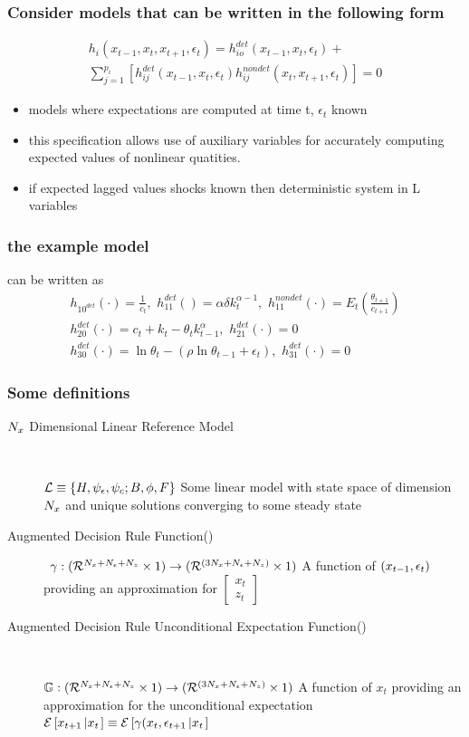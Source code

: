 \documentclass[tikz]{beamer}
\begin{document}
\begin{frame}
\frametitle{Consider  models that can be written in  the following form}


\begin{gather}
  h_i(x_{t-1},x_{t},x_{t+1},\epsilon_t)=h^{det}_{io}(x_{t-1},x_{t},\epsilon_t)+\\ \sum_{j=1}^{p_i} [h^{det}_{ij}(x_{t-1},x_{t},\epsilon_t)h^{nondet}_{ij}(x_{t},x_{t+1},\epsilon_t)]=0
\end{gather}

\begin{itemize}
\item models where expectations are computed at time t, $\epsilon_t$  known
\item this specification allows use of auxiliary variables for 
accurately computing expected values of nonlinear quatities.
\item if expected lagged values shocks known then deterministic system in L variables
\end{itemize}

\end{frame}


\begin{frame}
\frametitle{the example  model }
\label{sec:simple-rbc-model-ext} can be written as
\begin{gather}
h_{10^{det}}(\cdot)=\frac{1}{c_t},\,\,
h_{11}^{det}()=\alpha \delta k_{t}^{\alpha-1} ,\,\,
h_{11}^{nondet}(\cdot)=E_t \left (\frac{\theta_{t+1}}{c_{t+1}} \right )\\
h_{20}^{det}(\cdot)=c_t + k_t-\theta_tk_{t-1}^\alpha,\,\,
h_{21}^{det}(\cdot)=0\\
h_{30}^{det}(\cdot)=\ln \theta_t -(\rho \ln \theta_{t-1} + \epsilon_t),\,\,
h_{31}^{det}(\cdot)=0
\end{gather}

\end{frame}

\begin{frame}
  \frametitle{Some definitions}
  \begin{description}
  \item[${N_x}$ Dimensional Linear Reference Model] \ 

${\mathcal{L}} \equiv {\{H,\psi_\epsilon,\psi_c;B,\phi,F\}}$ Some linear model with state space of dimension
${N_x}$ and unique solutions converging 
to some steady state
  \item[Augmented Decision Rule Function(\ADR)]  \ 
${{\gamma}}: {({\mathcal{R}^{{N_x}+{N_\epsilon}+{N_z}}}\times 1)\rightarrow ({\mathcal{R}^{({3{N_x}+{N_\epsilon}+{N_z}})}}\times 1)}$  A function of ${(x_{t-1},\epsilon_t)}$ providing an approximation 
for $\begin{bmatrix}
  x_t\\z_t
\end{bmatrix}$
  \item[Augmented Decision Rule Unconditional Expectation Function(\ADRUE)]  \ 

${\mathbb{G}}: {({\mathcal{R}^{{N_x}+{N_\epsilon}+{N_z}}}\times 1)\rightarrow ({\mathcal{R}^{({3{N_x}+{N_\epsilon}+{N_z}})}}\times 1)}$  A function of $x_t$ providing an approximation 
for the unconditional expectation  
${\mathcal{E}\left [ x_{t+1} \left | x_t \right . \right ]}\equiv  {\mathcal{E}\left [ {{\gamma}}(x_t,\epsilon_{t+1} \left | x_t \right . \right ]}$

  \end{description}
\end{frame}
\end{document}
